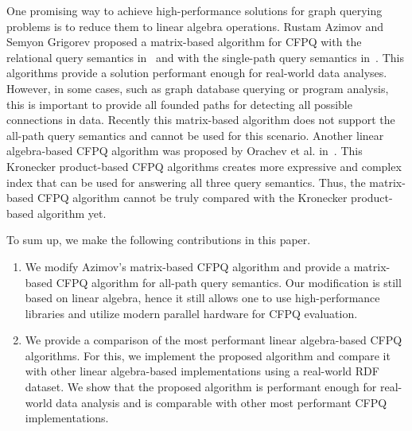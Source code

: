 One promising way to achieve high-performance solutions for graph querying problems is to reduce them to linear algebra operations. Rustam Azimov and Semyon Grigorev proposed a matrix-based algorithm for CFPQ with the relational query semantics in~\cite{Azimov:2018:CPQ:3210259.3210264} and with the single-path query semantics in~\cite{10.1145/3398682.3399163}.
This algorithms provide a solution performant enough for real-world data analyses.
However, in some cases, such as graph database querying or program analysis, this is important to provide all founded paths for detecting all possible connections in data. Recently this matrix-based algorithm does not support the all-path query semantics and cannot be used for this scenario. Another linear algebra-based CFPQ algorithm was proposed by Orachev et al. in~\cite{kron}. This Kronecker product-based CFPQ algorithms creates more expressive and complex index that can be used for answering all three query semantics. Thus, the matrix-based CFPQ algorithm cannot be truly compared with the Kronecker product-based algorithm yet.

To sum up, we make the following contributions in this paper.
\begin{enumerate}
	\item We modify Azimov's matrix-based CFPQ algorithm and provide a matrix-based CFPQ algorithm for all-path query semantics.
	Our modification is still based on linear algebra, hence it still allows one to use high-performance libraries and utilize modern parallel hardware for CFPQ evaluation.
	\item We provide a comparison of the most performant linear algebra-based CFPQ algorithms. For this, we implement the proposed algorithm and compare it with other linear algebra-based implementations using a real-world RDF dataset. We show that the proposed algorithm is performant enough for real-world data analysis and is comparable with other most performant CFPQ implementations.
\end{enumerate}